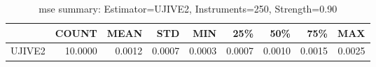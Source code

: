 \begin{table}[ht]
\centering
\caption{mse summary: Estimator=UJIVE2, Instruments=250, Strength=0.90}
\begin{tabular}{lrrrrrrrr}
\toprule
 & COUNT & MEAN & STD & MIN & 25\% & 50\% & 75\% & MAX \\
\midrule
UJIVE2 & 10.0000 & 0.0012 & 0.0007 & 0.0003 & 0.0007 & 0.0010 & 0.0015 & 0.0025 \\
\bottomrule
\end{tabular}
\end{table}

